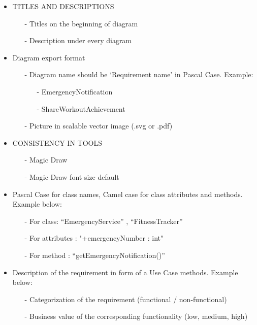 \documentclass{article}
\begin{document}
\begin{itemize}
\item
  TITLES AND DESCRIPTIONS
 	\begin{itemize} 
 	\item[-]Titles on the beginning of diagram
  	\item[-] Description under every diagram
	\end{itemize}
\end{itemize}

\begin{itemize}
\item
  Diagram export format
  \begin{itemize}
	\item[-] Diagram name should be ‘Requirement name’ in Pascal Case. Example:
		\begin{itemize}
			\item[-] EmergencyNotification
			\item[-] ShareWorkoutAchievement
		\end{itemize}
	\item[-]Picture in scalable vector image (.svg or .pdf)
	\end{itemize}
\end{itemize}



\begin{itemize}
\item
  CONSISTENCY IN TOOLS
  \begin{itemize}
	\item[-] Magic Draw
	\item[-] Magic Draw font size default
   \end{itemize}
\end{itemize}


\begin{itemize}
\item
  Pascal Case for class names, Camel case for class attributes and
  methods. Example below:
  \begin{itemize}
	\item[-] For class: ``EmergencyService'' , ``FitnessTracker''
	\item[-] For attributes : "+emergencyNumber : int"
	\item[-] For method : ``getEmergencyNotification()''
   \end{itemize}
\end{itemize}

\begin{itemize}
\item
  Description of the requirement in form of a Use Case
  methods. Example below:
  \begin{itemize}
	\item[-] Categorization of the requirement (functional / non-functional)
	\item[-] Business value of the corresponding functionality (low, medium, high)
   \end{itemize}
\end{itemize}
\end{document}
